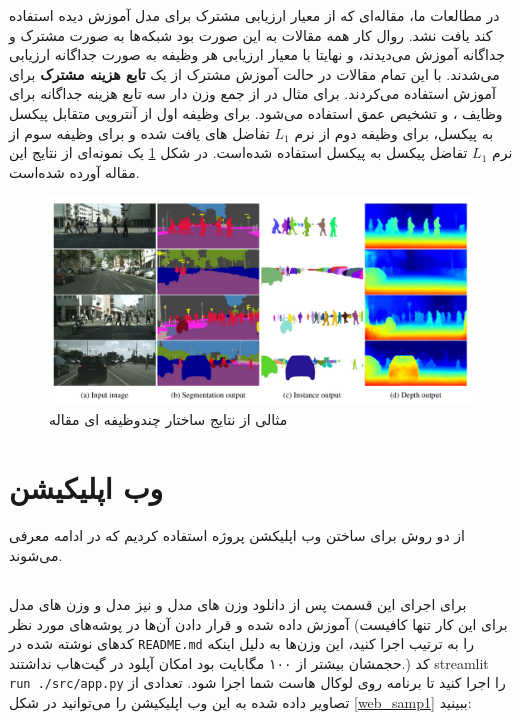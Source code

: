 \documentclass[12pt,a4paper]{report}
\begin{document}
در مطالعات ما، مقاله‌ای که از معیار ارزیابی مشترک برای مدل آموزش دیده استفاده کند یافت نشد.
روال کار همه مقالات به این صورت بود شبکه‌ها به صورت مشترک و جداگانه آموزش می‌دیدند،
و نهایتا با معیار ارزیابی هر وظیفه به صورت جداگانه ارزیابی می‌شدند.
با این تمام مقالات در حالت آموزش مشترک از یک \textbf{تابع هزینه مشترک} برای آموزش استفاده می‌کردند.
برای مثال در \cite{kendall2018multitask} از جمع وزن دار سه تابع هزینه جداگانه
برای وظایف ،  و تشخیص عمق استفاده می‌شود.
برای وظیفه اول از آنتروپی متقابل پیکسل به پیکسل،
برای وظیفه دوم از نرم $L_1$
تفاضل  های یافت شده و برای وظیفه سوم از
نرم $L_1$ تفاضل پیکسل به پیکسل استفاده شده‌است.
در شکل \ref{joint_res} یک نمونه‌ای از نتایج این مقاله آورده شده‌است.
\begin{figure}
  \centering
  \includegraphics[width=\textwidth]{Images//joint3.png}
  \caption{مثالی از نتایج ساختار چندوظیفه ای مقاله \cite{kendall2018multitask}}\label{joint_res}
\end{figure}


\chapter{وب اپلیکیشن}
از دو روش برای ساختن وب اپلیکشن پروژه استفاده کردیم که در ادامه معرفی می‌شوند.
\section{}
برای اجرای این قسمت پس از دانلود وزن های مدل  و نیز مدل و  وزن های  مدل آموزش داده شده  و قرار دادن آن‌ها در پوشه‌های مورد نظر
(برای این کار تنها کافیست کدهای نوشته شده در \verb"README.md" را  به ترتیب اجرا کنید، این وزن‌ها به دلیل اینکه حجمشان بیشتر از ۱۰۰ مگابایت بود امکان آپلود در گیت‌هاب نداشتند.)
کد streamlit \verb"run ./src/app.py" را اجرا کنید تا برنامه روی لوکال هاست شما اجرا شود.
تعدادی از تصاویر داده شده به این وب اپلیکیشن را می‌توانید در شکل \ref{web_samp1} ببینید:
\end{document}
